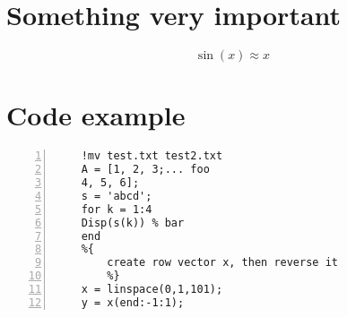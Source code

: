\setlength{\midchapskip}{20pt}
\renewcommand*{\afterchapternum}{\par\nobreak\vskip \midchapskip} %
\chapter{Something very important}
\label{app:details}

\[
    \sin(x) \approx x
\]

\chapter{Code example}

\begin{lstlisting}[style=Matlab-editor, frame=single, numbers=left,]
	%% Пример кода Matlab
	!mv test.txt test2.txt
	A = [1, 2, 3;... foo
	4, 5, 6];
	s = 'abcd';
	for k = 1:4
	Disp(s(k)) % bar
	end
	%{
		create row vector x, then reverse it
		%}
	x = linspace(0,1,101);
	y = x(end:-1:1);
\end{lstlisting}